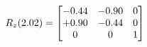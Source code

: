 \documentclass[preview]{standalone}
\begin{document}
\begin{align*}
\special{dvisvgm:raw <g id='unique000'>}R_{z}(2.02) = \begin{bmatrix}-0.44 & -0.90 & 0 \\+0.90 & -0.44 & 0 \\0 & 0 & 1\end{bmatrix}\special{dvisvgm:raw </g>}
\end{align*}
\end{document}
